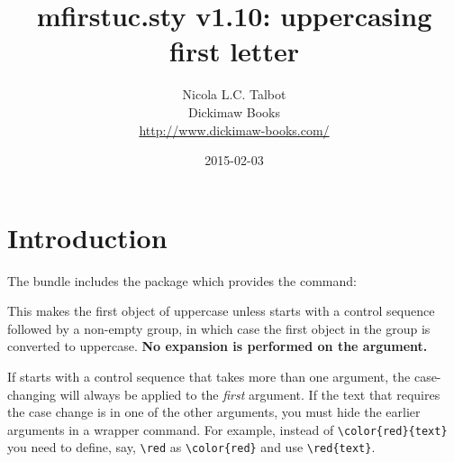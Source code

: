 \documentclass{nlctdoc}
\begin{document}
 \title{mfirstuc.sty v1.10: 
uppercasing first letter}
 \author{Nicola L.C. Talbot\\[10pt]
Dickimaw Books\\
\url{http://www.dickimaw-books.com/}}

 \date{2015-02-03}
 \maketitle
 \tableofcontents

 \section{Introduction}
 \label{sec:intro}

The  bundle includes the package 
 which provides the command:
\begin{definition}[\DescribeMacro{\makefirstuc}]
\end{definition}
This makes the first object of
 uppercase unless  starts with a control
sequence followed by a non-empty group, in which case the first
object in the group is converted to uppercase.
\textbf{No expansion is performed on the argument.}

\begin{important}
If  starts with a control sequence that takes more than
one argument, the case-changing will always be applied to the
\emph{first} argument. If the text that requires the case change is
in one of the other arguments, you must hide the earlier arguments
in a wrapper command. For example, instead of \verb|\color{red}{text}|
you need to define, say, \verb|\red| as \verb|\color{red}| and use
\verb|\red{text}|.
\end{important}
\end{document}
